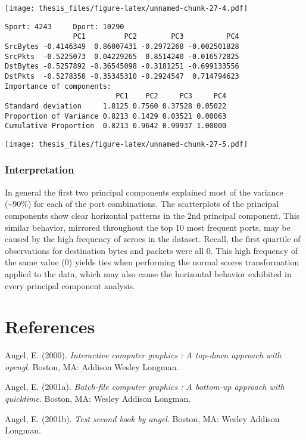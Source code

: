 \documentclass[12pt,twoside]{dukestatscithesis}
\theoremstyle{definition}
\theoremstyle{definition}
\theoremstyle{definition}
\theoremstyle{remark}
\begin{document}
\texttt{[image: thesis\_files/figure-latex/unnamed-chunk-27-4.pdf]}
\begin{verbatim}
Sport: 4243     Dport: 10290 
                PC1         PC2        PC3          PC4
SrcBytes -0.4146349  0.86007431 -0.2972268 -0.002501828
SrcPkts  -0.5225073  0.04229265  0.8514240 -0.016572825
DstBytes -0.5257892 -0.36545098 -0.3181251 -0.699133556
DstPkts  -0.5278350 -0.35345310 -0.2924547  0.714794623
Importance of components:
                          PC1    PC2     PC3     PC4
Standard deviation     1.8125 0.7560 0.37528 0.05022
Proportion of Variance 0.8213 0.1429 0.03521 0.00063
Cumulative Proportion  0.8213 0.9642 0.99937 1.00000
\end{verbatim}
\texttt{[image: thesis\_files/figure-latex/unnamed-chunk-27-5.pdf]}

\subsection{Interpretation}\label{interpretation}

In general the first two principal components explained most of the
variance (\textasciitilde{}90\%) for each of the port combinations. The
scatterplots of the principal components show clear horizontal patterns
in the 2nd principal component. This similar behavior, mirrored
throughout the top 10 most frequent ports, may be caused by the high
frequency of zeroes in the dataset. Recall, the first quartile of
observations for destination bytes and packets were all 0. This high
frequency of the same value (0) yields ties when performing the normal
scores transformation applied to the data, which may also cause the
horizontal behavior exhibited in every principal component analysis.

\backmatter

\chapter*{References}\label{references}


\noindent

\setlength{\parindent}{-0.20in} \setlength{\leftskip}{0.20in}
\setlength{\parskip}{8pt}

\hypertarget{refs}{}
\hypertarget{ref-angel2000}{}
Angel, E. (2000). \emph{Interactive computer graphics : A top-down
approach with opengl}. Boston, MA: Addison Wesley Longman.

\hypertarget{ref-angel2001}{}
Angel, E. (2001a). \emph{Batch-file computer graphics : A bottom-up
approach with quicktime}. Boston, MA: Wesley Addison Longman.

\hypertarget{ref-angel2002a}{}
Angel, E. (2001b). \emph{Test second book by angel}. Boston, MA: Wesley
Addison Longman.


\end{document}
